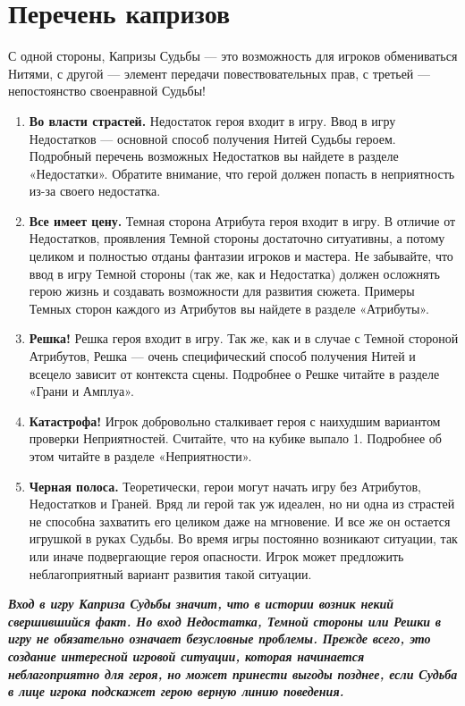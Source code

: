 \section{Перечень капризов}
С одной стороны, Капризы Судьбы — это возможность для игроков обмениваться Нитями, с другой — элемент передачи повествовательных прав, с третьей — непостоянство своенравной Судьбы!
\begin{enumerate}
\item \textbf{Во власти страстей.}
Недостаток героя входит в игру. Ввод в игру Недостатков — основной способ получения Нитей Судьбы героем. Подробный перечень возможных Недостатков вы найдете в разделе «Недостатки».
\newline
Обратите внимание, что герой должен попасть в неприятность из-за своего недостатка.
\item \textbf{Все имеет цену.}
Темная сторона Атрибута героя входит в игру. В отличие от Недостатков, проявления Темной стороны достаточно ситуативны, а потому целиком и полностью отданы фантазии игроков и мастера. Не забывайте, что ввод в игру Темной стороны (так же, как и Недостатка) должен осложнять герою жизнь и создавать возможности для развития сюжета. Примеры Темных сторон каждого из Атрибутов вы найдете в разделе «Атрибуты».
\item \textbf{Решка!}
Решка героя входит в игру. Так же, как и в случае с Темной стороной Атрибутов, Решка — очень специфический способ получения Нитей и всецело зависит от контекста сцены. Подробнее о Решке читайте в разделе «Грани и Амплуа».
\item \textbf{Катастрофа!}
Игрок добровольно сталкивает героя с наихудшим вариантом проверки Неприятностей. Считайте, что на кубике выпало 1. Подробнее об этом читайте в разделе «Неприятности».
\item \textbf{Черная полоса.}
Теоретически, герои могут начать игру без Атрибутов, Недостатков и Граней. Вряд ли герой так уж идеален, но ни одна из страстей не способна захватить его целиком даже на мгновение. И все же он остается игрушкой в руках Судьбы. Во время игры постоянно возникают ситуации, так или иначе подвергающие героя опасности. Игрок может предложить неблагоприятный вариант развития такой ситуации.
\end{enumerate}
\textbf{\textit{Вход в игру Каприза Судьбы значит, что в истории возник некий свершившийся факт. Но вход Недостатка, Темной стороны или Решки в игру не обязательно означает безусловные проблемы.
\newline Прежде всего, это создание интересной игровой ситуации, которая начинается неблагоприятно для героя, но может принести выгоды позднее, если Судьба в лице игрока подскажет герою верную линию поведения.}}
